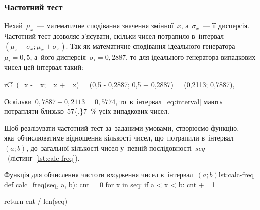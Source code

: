 \documentclass[
	a4paper,
	oneside,
	BCOR = 10mm,
	DIV = 12,
	12pt,
	headings = normal,
]{scrartcl}
\newcommand{\longvar}[1]{\mathit{#1}}
\begin{document}
			\subsubsection{Частотний тест}
			\label{sssec:freq-test}
				Нехай~$\mu_{x}$~— математичне сподівання значення змінної~$x$, а~$\sigma_{x}$~— її дисперсія. Частотний тест дозволяє з'ясувати, скільки чисел потрапило в~інтервал~$(\mu_{x} - \sigma_{x}; \mu_{x} + \sigma_{x})$. Так як математичне сподівання ідеального генератора~$\mu_{i} = 0{,}5$, а~його дисперсія~$\sigma_{i} = 0{,}2887$, то для ідеального генератора випадкових чисел цей інтервал такий:
				\begin{IEEEeqnarray}{rCl}
				\label{eq:interval}
					(\mu_{x} - \sigma_{x}; \mu_{x} + \sigma_{x}) = (0{,}5 - 0{,}2887; 0{,}5 + 0{,}2887) = (0{,}2113; 0{,}7887){,}
				\end{IEEEeqnarray}
				Оскільки~$0{,}7887 - 0{,}2113 = 0{,}5774$, то~в~інтервал~\eqref{eq:interval} мають потрапляти близько~\SI{57{,}7}{\percent} усіх випадкових чисел. 

				Щоб реалізувати частотний тест за~заданими умовами, створюємо функцію, яка~обчислюватиме відношення кількості чисел, що~потрапили в~інтервал~$(a; b)$, до~загальної кількості чисел у~певній послідовності~$\longvar{seq}$~(лістинг~\ref{lst:calc-freq}).

				\begin{listingpython}{Функція для обчислення частоти входження чисел в~інтервал~$(a; b)$}{lst:calc-freq}
def calc_freq(seq, a, b):
    cnt = 0
    for x in seq:
        if a < x < b:
            cnt += 1

    return cnt / len(seq)
				\end{listingpython}
\end{document}

